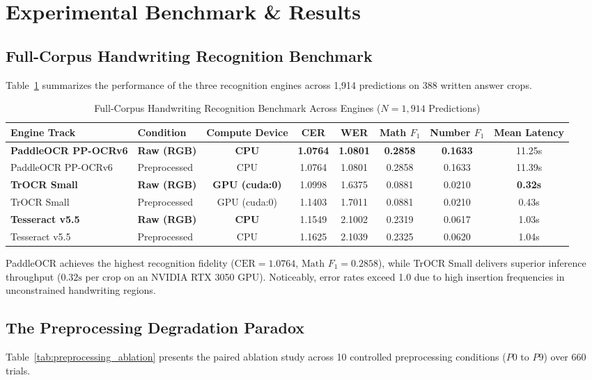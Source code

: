 \documentclass[journal]{IEEEtran}
\begin{document}
\section{Experimental Benchmark \& Results}

\subsection{Full-Corpus Handwriting Recognition Benchmark}
Table~\ref{tab:ocr_benchmark} summarizes the performance of the three recognition engines across 1,914 predictions on 388 written answer crops.

\begin{table}[t]
\centering
\caption{Full-Corpus Handwriting Recognition Benchmark Across Engines ($N = 1,914$ Predictions)}
\label{tab:ocr_benchmark}
\begin{tabular}{llcccccc}
\toprule
\textbf{Engine Track} & \textbf{Condition} & \textbf{Compute Device} & \textbf{CER} & \textbf{WER} & \textbf{Math $F_1$} & \textbf{Number $F_1$} & \textbf{Mean Latency} \\
\midrule
\textbf{PaddleOCR PP-OCRv6} & \textbf{Raw (RGB)} & \textbf{CPU} & \textbf{1.0764} & \textbf{1.0801} & \textbf{0.2858} & \textbf{0.1633} & 11.25s \\
PaddleOCR PP-OCRv6 & Preprocessed & CPU & 1.0764 & 1.0801 & 0.2858 & 0.1633 & 11.39s \\
\textbf{TrOCR Small} & \textbf{Raw (RGB)} & \textbf{GPU (cuda:0)} & 1.0998 & 1.6375 & 0.0881 & 0.0210 & \textbf{0.32s} \\
TrOCR Small & Preprocessed & GPU (cuda:0) & 1.1403 & 1.7011 & 0.0881 & 0.0210 & 0.43s \\
\textbf{Tesseract v5.5} & \textbf{Raw (RGB)} & \textbf{CPU} & 1.1549 & 2.1002 & 0.2319 & 0.0617 & 1.03s \\
Tesseract v5.5 & Preprocessed & CPU & 1.1625 & 2.1039 & 0.2325 & 0.0620 & 1.04s \\
\bottomrule
\end{tabular}
\end{table}

PaddleOCR achieves the highest recognition fidelity ($\text{CER} = 1.0764$, $\text{Math } F_1 = 0.2858$), while TrOCR Small delivers superior inference throughput ($0.32\text{s}$ per crop on an NVIDIA RTX 3050 GPU). Noticeably, error rates exceed 1.0 due to high insertion frequencies in unconstrained handwriting regions.

\subsection{The Preprocessing Degradation Paradox}
Table~\ref{tab:preprocessing_ablation} presents the paired ablation study across 10 controlled preprocessing conditions ($P0$ to $P9$) over 660 trials.
\end{document}
